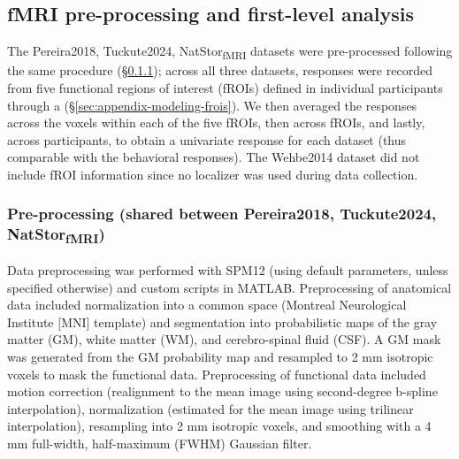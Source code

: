 \documentclass[11pt]{article}
\begin{document}


\subsection{fMRI pre-processing and first-level analysis}

The Pereira2018, Tuckute2024, NatStor\textsubscript{fMRI} datasets were pre-processed following the same procedure (§\ref{sec:appendix-preproc-all}); across all three datasets, responses were recorded from five functional regions of interest (fROIs) defined in individual participants through a  (§\ref{sec:appendix-modeling-frois}). We then averaged the responses across the voxels within each of the five fROIs, then across fROIs, and lastly, across participants, to obtain a univariate response for each dataset (thus comparable with the behavioral responses). The Wehbe2014 dataset did not include fROI information since no localizer was used during data collection. 

\subsubsection{Pre-processing (shared between Pereira2018, Tuckute2024, NatStor\textsubscript{fMRI})} \label{sec:appendix-preproc-all}

Data preprocessing was performed with SPM12 (using default parameters, unless specified otherwise) and custom scripts in MATLAB. Preprocessing of anatomical data included normalization into a common space (Montreal Neurological Institute [MNI] template) and segmentation into probabilistic maps of the gray matter (GM), white matter (WM), and cerebro-spinal fluid (CSF). A GM mask was generated from the GM probability map and resampled to 2 mm isotropic voxels to mask the functional data. Preprocessing of functional data included motion correction (realignment to the mean image using second-degree b-spline interpolation), normalization (estimated for the mean image using trilinear interpolation), resampling into 2 mm isotropic voxels, and smoothing with a 4 mm full-width, half-maximum (FWHM) Gaussian filter.
\end{document}
